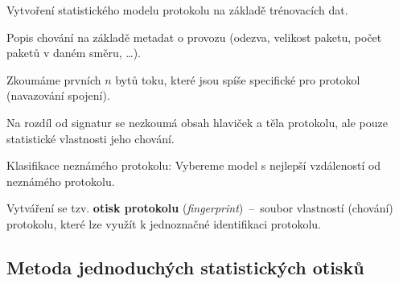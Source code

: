 \begin{compactitem}
    \item Vytvoření statistického modelu protokolu na základě trénovacích dat. \begin{compactitem}
        \item Popis chování na základě metadat o provozu (odezva, velikost paketu, počet paketů v daném směru, \dots).
        \item Zkoumáme prvních $n$ bytů toku, které jsou spíše specifické pro protokol (navazování spojení).
        \item Na rozdíl od signatur se nezkoumá obsah hlaviček a těla protokolu, ale pouze statistické vlastnosti jeho chování.
    \end{compactitem}

    \item Klasifikace neznámého protokolu: Vybereme model s nejlepší vzdáleností od neznámého protokolu.
    \item Vytváření se tzv. \textbf{otisk protokolu} (\textit{fingerprint})~--~soubor vlastností (chování) protokolu, které lze využít k jednoznačné identifikaci protokolu.
\end{compactitem}

\subsection*{Metoda jednoduchých statistických otisků}

